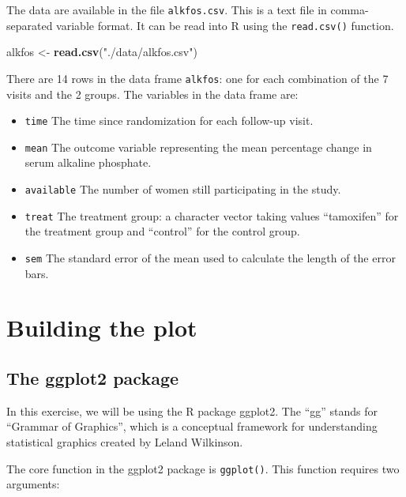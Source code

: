 \documentclass[
]{book}
\newenvironment{Shaded}{\begin{snugshade}}{\end{snugshade}}
\newcommand{\FunctionTok}[1]{\textcolor[rgb]{0.13,0.29,0.53}{\textbf{#1}}}
\newcommand{\NormalTok}[1]{#1}
\newcommand{\OtherTok}[1]{\textcolor[rgb]{0.56,0.35,0.01}{#1}}
\newcommand{\StringTok}[1]{\textcolor[rgb]{0.31,0.60,0.02}{#1}}
\providecommand{\tightlist}{%
  \setlength{\itemsep}{0pt}\setlength{\parskip}{0pt}}
\begin{document}
The data are available in the file \texttt{alkfos.csv}. This is a text file in comma-separated variable format. It can be read into R using the \texttt{read.csv()} function.

\begin{Shaded}
\begin{Highlighting}[]
\NormalTok{alkfos }\OtherTok{\textless{}{-}} \FunctionTok{read.csv}\NormalTok{(}\StringTok{"./data/alkfos.csv"}\NormalTok{)}
\end{Highlighting}
\end{Shaded}

There are 14 rows in the data frame \texttt{alkfos}: one for each combination of the 7 visits and the 2 groups. The variables in the data frame are:

\begin{itemize}
\tightlist
\item
  \texttt{time} The time since randomization for each follow-up visit.
\item
  \texttt{mean} The outcome variable representing the mean percentage change in serum alkaline phosphate.
\item
  \texttt{available} The number of women still participating in the study.
\item
  \texttt{treat} The treatment group: a character vector taking values ``tamoxifen'' for the treatment group and ``control'' for the control group.
\item
  \texttt{sem} The standard error of the mean used to calculate the length of the error bars.
\end{itemize}

\section{Building the plot}\label{building-the-plot}

\subsection{The ggplot2 package}\label{the-ggplot2-package}

In this exercise, we will be using the R package ggplot2. The ``gg'' stands for ``Grammar of Graphics'', which is a conceptual framework for understanding statistical graphics created by Leland Wilkinson.

The core function in the ggplot2 package is \texttt{ggplot()}. This function requires two arguments:
\end{document}
